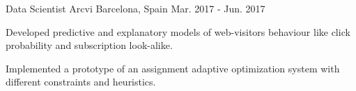 
\begin{cventries}

  \cventry
    {Data Scientist} %
    {Arcvi} %
    {Barcelona, Spain} %
    {Mar. 2017 - Jun. 2017} %
    {
      \begin{cvitems} %
        \item {Developed predictive and explanatory models of web-visitors behaviour like click probability and subscription look-alike.} %
        \item {Implemented a prototype of an assignment adaptive optimization system with different constraints and heuristics.} %
      \end{cvitems}
    }
\end{cventries}
